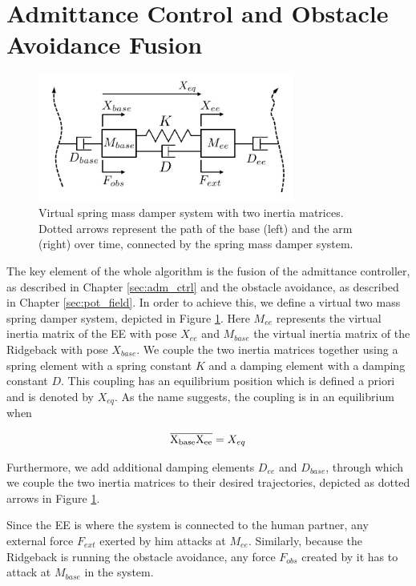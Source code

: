 \section{Admittance Control and Obstacle Avoidance Fusion}
\label{sec:fusion}
\begin{figure}
   \centering
   \includegraphics[width=0.75\textwidth]{images/admittance_model.jpg}
   \caption{Virtual spring mass damper system with two inertia matrices. Dotted arrows represent the path of the base (left) and the arm (right) over time, connected by the spring mass damper system.}
   \label{pics:admittance_model}
\end{figure}
The key element of the whole algorithm is the fusion of the admittance controller, as described in Chapter \ref{sec:adm_ctrl} and the obstacle avoidance, as described in Chapter \ref{sec:pot_field}. In order to achieve this, we define a virtual two mass spring damper system, depicted in Figure \ref{pics:admittance_model}. Here $M_{ee}$ represents the virtual inertia matrix of the EE with pose $X_{ee}$ and $M_{base}$ the virtual inertia matrix of the Ridgeback with pose $X_{base}$. We couple the two inertia matrices together using a spring element with a spring constant $K$ and a damping element with a damping constant $D$. This coupling has an equilibrium position which is defined a priori and is denoted by $X_{eq}$. As the name suggests,  the coupling is in an equilibrium when

\begin{equation}
\overline{\rm X_{base}X_{ee}} = X_{eq}
\end{equation}

Furthermore, we add additional damping elements $D_{ee}$ and $D_{base}$, through which we couple the two inertia matrices to their desired trajectories, depicted as dotted arrows in Figure \ref{pics:admittance_model}.

Since the EE is where the system is connected to the human partner, any external force $F_{ext}$ exerted by him attacks at $M_{ee}$. Similarly, because the Ridgeback is running the obstacle avoidance, any force $F_{obs}$ created by it has to attack at $M_{base}$ in the system. 

